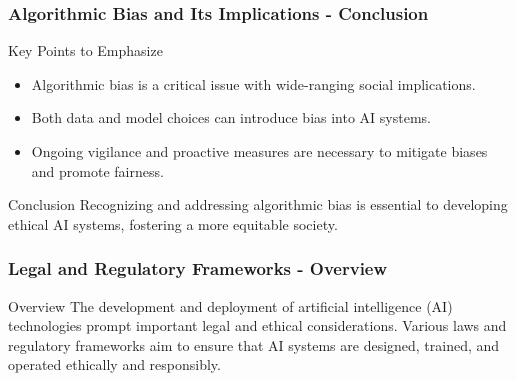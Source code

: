\documentclass{beamer}
\begin{document}
\begin{frame}[fragile]
    \frametitle{Algorithmic Bias and Its Implications - Conclusion}
    \begin{block}{Key Points to Emphasize}
        \begin{itemize}
            \item Algorithmic bias is a critical issue with wide-ranging social implications.
            \item Both data and model choices can introduce bias into AI systems.
            \item Ongoing vigilance and proactive measures are necessary to mitigate biases and promote fairness.
        \end{itemize}
    \end{block}
    
    \begin{block}{Conclusion}
        Recognizing and addressing algorithmic bias is essential to developing ethical AI systems, fostering a more equitable society.
    \end{block}
\end{frame}

\begin{frame}[fragile]
    \frametitle{Legal and Regulatory Frameworks - Overview}
    \begin{block}{Overview}
        The development and deployment of artificial intelligence (AI) technologies prompt important legal and ethical considerations. 
        Various laws and regulatory frameworks aim to ensure that AI systems are designed, trained, and operated ethically and responsibly.
    \end{block}
\end{frame}
\end{document}
